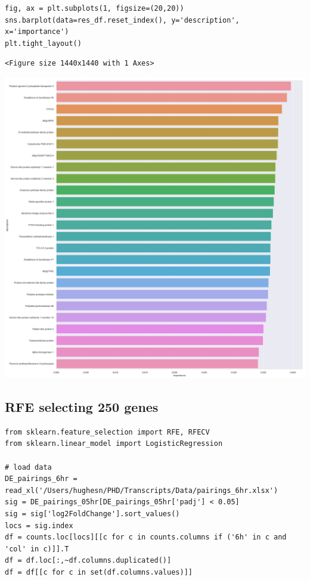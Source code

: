 \documentclass[11pt]{article}
\begin{document}
\begin{verbatim}
fig, ax = plt.subplots(1, figsize=(20,20))
sns.barplot(data=res_df.reset_index(), y='description', x='importance')
plt.tight_layout()
\end{verbatim}

\begin{verbatim}
<Figure size 1440x1440 with 1 Axes>
\end{verbatim}


\begin{center}
\includegraphics[width=.9\linewidth]{obipy-resources/93e2fbf76ed477962282ae99767b8408de4d3ed9/21f33ed725c0b0940b60e1588a12604820f36aa7.png}
\end{center}


\subsection{RFE selecting 250 genes}
\label{sec:org2f8fc04}
\begin{verbatim}
from sklearn.feature_selection import RFE, RFECV
from sklearn.linear_model import LogisticRegression

# load data
DE_pairings_6hr = read_xl('/Users/hughesn/PHD/Transcripts/Data/pairings_6hr.xlsx')
sig = DE_pairings_05hr[DE_pairings_05hr['padj'] < 0.05]
sig = sig['log2FoldChange'].sort_values()
locs = sig.index
df = counts.loc[locs][[c for c in counts.columns if ('6h' in c and 'col' in c)]].T
df = df.loc[:,~df.columns.duplicated()]
df = df[[c for c in set(df.columns.values)]]
\end{verbatim}
\end{document}
